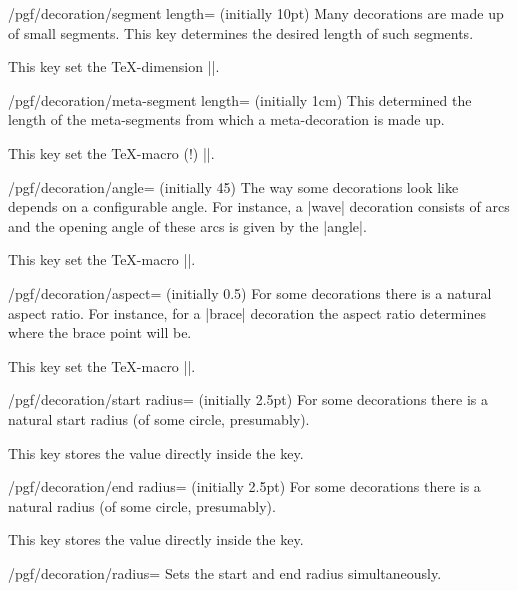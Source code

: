 \begin{key}{/pgf/decoration/segment length= (initially 10pt)}
  Many decorations are made up of small segments. This key determines
  the desired length of such segments. 

  This key set the \TeX-dimension |\pgfdecorationsegmentlength|. 
\end{key}

\begin{key}{/pgf/decoration/meta-segment length= (initially 1cm)}
  This determined the length of the meta-segments from which a
  meta-decoration is made up.

  This key set the \TeX-macro (!) |\pgfmetadecorationsegmentlength|. 
\end{key}

\begin{key}{/pgf/decoration/angle= (initially 45)}
  The way some decorations look like depends on a configurable angle. For
  instance, a |wave| decoration consists of arcs and the opening angle
  of these arcs is given by the |angle|.

  This key set the \TeX-macro |\pgfdecorationsegmentangle|. 
\end{key}

\begin{key}{/pgf/decoration/aspect= (initially 0.5)}
  For some decorations there is a natural aspect ratio. For instance,
  for a |brace| decoration the aspect ratio determines where the brace
  point will be.

  This key set the \TeX-macro |\pgfdecorationsegmentaspect|. 
\end{key}

\begin{key}{/pgf/decoration/start radius= (initially 2.5pt)}
  For some decorations there is a natural start radius (of some circle, presumably).

  This key stores the value directly inside the key.
\end{key}

\begin{key}{/pgf/decoration/end radius= (initially 2.5pt)}
  For some decorations there is a natural radius (of some circle, presumably).

  This key stores the value directly inside the key.
\end{key}

\begin{stylekey}{/pgf/decoration/radius=}
  Sets the start and end radius simultaneously.
\end{stylekey}


